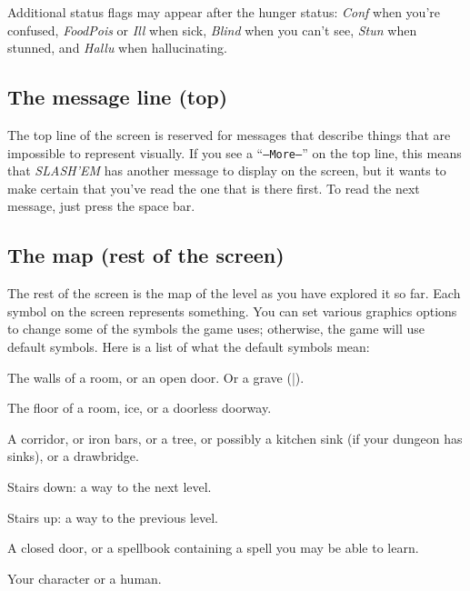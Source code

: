 Additional status flags may appear after the hunger status:  {\it Conf\/}
when you're confused, {\it FoodPois\/} or {\it Ill\/}
when sick, {\it Blind\/} when you can't
see, {\it Stun\/} when stunned, and {\it Hallu\/} when hallucinating.
\subsection*{The message line (top)}


The top line of the screen is reserved for messages that describe
things that are impossible to represent visually.  If you see a
``{\tt --More--}'' on the top line, this means that {\it SLASH'EM\/} has
another message to display on the screen, but it wants to make certain
that you've read the one that is there first.  To read the next message,
just press the space bar.
\subsection*{The map (rest of the screen)}


The rest of the screen is the map of the level as you have explored it
so far.  Each symbol on the screen represents something.  You can set
various graphics options to change some of the symbols the game uses;
otherwise, the game will use default symbols.  Here is a list of what the
default symbols mean:
\blist{}

\item[\tb{- {\rm and} |}]
The walls of a room, or an open door.  Or a grave (|).

\item[\tb{.}]
The floor of a room, ice, or a doorless doorway.

\item[\tb{\#}]
A corridor, or iron bars, or a tree, or possibly a kitchen sink (if
your dungeon has sinks), or a drawbridge.

\item[\tb{>}]
Stairs down: a way to the next level.

\item[\tb{<}]
Stairs up: a way to the previous level.

\item[\tb{+}]
A closed door, or a spellbook containing a spell you may be able to learn.

\item[\tb{@}]
Your character or a human.

